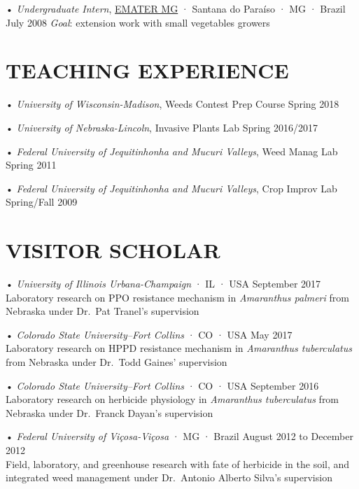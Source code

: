 \documentclass[11pt,]{article}
\begin{document}
• \emph{Undergraduate Intern},
\href{http://www.emater.mg.gov.br/}{EMATER MG} · Santana do Paraíso · MG
· Brazil \hfill July 2008 \emph{Goal}: extension work with small
vegetables growers

\newpage

\hypertarget{teaching-experience}{%
\section{TEACHING EXPERIENCE}\label{teaching-experience}}

• \emph{University of Wisconsin-Madison}, Weeds Contest Prep Course
\hfill Spring 2018

• \emph{University of Nebraska-Lincoln}, Invasive Plants Lab
\hfill Spring 2016/2017

• \emph{Federal University of Jequitinhonha and Mucuri Valleys}, Weed
Manag Lab \hfill Spring 2011

• \emph{Federal University of Jequitinhonha and Mucuri Valleys}, Crop
Improv Lab \hfill Spring/Fall 2009

\hypertarget{visitor-scholar}{%
\section{VISITOR SCHOLAR}\label{visitor-scholar}}

• \emph{University of Illinois Urbana-Champaign} · IL · USA
\hfill September 2017\\
Laboratory research on PPO resistance mechanism in \emph{Amaranthus
palmeri} from Nebraska under Dr.~Pat Tranel's supervision

• \emph{Colorado State University--Fort Collins} · CO · USA \hfill May
2017\\
Laboratory research on HPPD resistance mechanism in \emph{Amaranthus
tuberculatus} from Nebraska under Dr.~Todd Gaines' supervision

• \emph{Colorado State University--Fort Collins} · CO · USA
\hfill September 2016\\
Laboratory research on herbicide physiology in \emph{Amaranthus
tuberculatus} from Nebraska under Dr.~Franck Dayan's supervision

• \emph{Federal University of Viçosa-Viçosa} · MG · Brazil \hfill August
2012 to December 2012\\
Field, laboratory, and greenhouse research with fate of herbicide in the
soil, and integrated weed management under Dr.~Antonio Alberto Silva's
supervision
\end{document}
